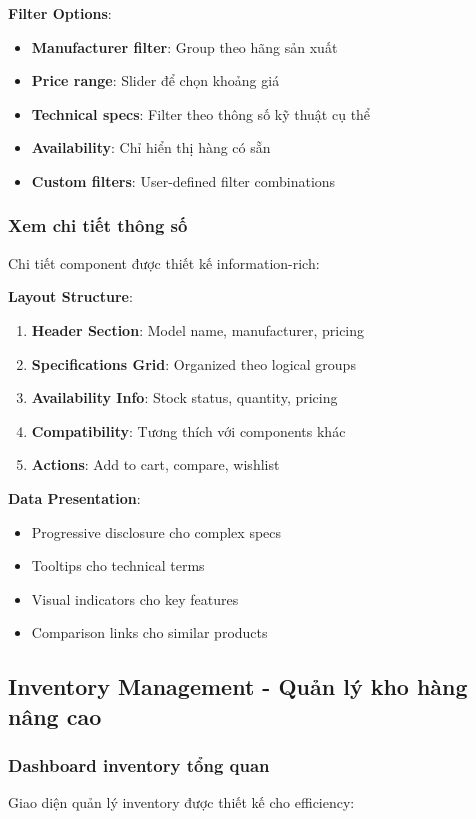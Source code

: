 \documentclass[12pt,a4paper]{article}
\begin{document}
\textbf{Filter Options}:
\begin{itemize}
    \item \textbf{Manufacturer filter}: Group theo hãng sản xuất
    \item \textbf{Price range}: Slider để chọn khoảng giá
    \item \textbf{Technical specs}: Filter theo thông số kỹ thuật cụ thể
    \item \textbf{Availability}: Chỉ hiển thị hàng có sẵn
    \item \textbf{Custom filters}: User-defined filter combinations
\end{itemize}

\subsubsection{Xem chi tiết thông số}
Chi tiết component được thiết kế information-rich:

\textbf{Layout Structure}:
\begin{enumerate}
    \item \textbf{Header Section}: Model name, manufacturer, pricing
    \item \textbf{Specifications Grid}: Organized theo logical groups
    \item \textbf{Availability Info}: Stock status, quantity, pricing
    \item \textbf{Compatibility}: Tương thích với components khác
    \item \textbf{Actions}: Add to cart, compare, wishlist
\end{enumerate}

\textbf{Data Presentation}:
\begin{itemize}
    \item Progressive disclosure cho complex specs
    \item Tooltips cho technical terms
    \item Visual indicators cho key features
    \item Comparison links cho similar products
\end{itemize}

\subsection{Inventory Management - Quản lý kho hàng nâng cao}
\subsubsection{Dashboard inventory tổng quan}
Giao diện quản lý inventory được thiết kế cho efficiency:
\end{document}
